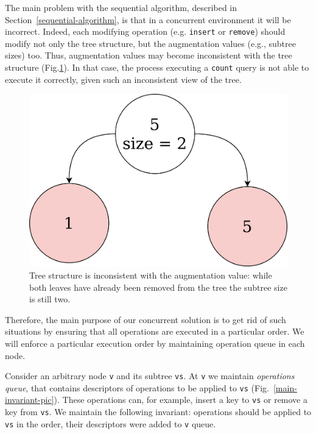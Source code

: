 \documentclass[times, dvipsnames,%
               languages={russian,english} %
              ]{itmo-student-thesis}
\begin{document}
The main problem with the sequential algorithm, described in Section~\ref{sequential-algorithm}, is that in a concurrent environment it will be incorrect. Indeed, each modifying operation (e.g. \texttt{insert} or \texttt{remove}) should modify not only the tree structure, but the augmentation values (e.g., subtree sizes) too. Thus, augmentation values may become inconsistent with the tree structure (Fig.\ref{inconsistency-pic}). In that case, the process executing a \texttt{count} query is not able to execute it correctly, given such an inconsistent view of the tree.

\begin{figure}[H]
  \centering
  \caption{Tree structure is inconsistent with the augmentation value: while both leaves have already been removed from the tree the subtree size is still two.}
  \label{inconsistency-pic}
  \includegraphics[width=0.5\linewidth]{pics/inconsistency.png}
\end{figure}

Therefore, the main purpose of our concurrent solution is to get rid of such situations by ensuring that all operations are executed in a particular order. We will enforce a particular execution order by maintaining operation queue in each node.

Consider an arbitrary node \texttt{v} and its subtree \texttt{vs}. At \texttt{v} we maintain \emph{operations queue}, that contains descriptors of operations to be applied to  \texttt{vs} (Fig.~\ref{main-invariant-pic}). These operations can, for example, insert a key to \texttt{vs} or remove a key from \texttt{vs}. We maintain the following invariant: operations should be applied to \texttt{vs} in the order, their descriptors were added to \texttt{v} queue.
\end{document}
